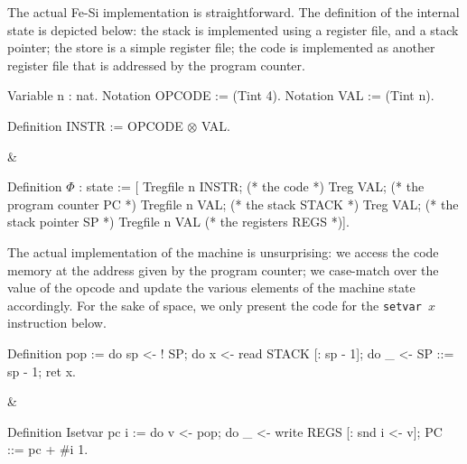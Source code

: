 \documentclass{llncs}
\begin{document}
The actual Fe-Si implementation is straightforward. The definition of
the internal state is depicted below: the stack is implemented using a
register file, and a stack pointer; the store is a simple register
file; the code is implemented as another register file that is
addressed by the program counter.

\begin{twolistings}
\begin{coq}
Variable n : nat. 
Notation OPCODE := (Tint 4).  
Notation VAL := (Tint n). 

Definition INSTR := OPCODE $\otimes$ VAL.  
$ $
\end{coq}
&
\begin{coq}
Definition $\Phi$ : state := [
Tregfile n INSTR;       (* the code *)
Treg VAL;               (* the program counter PC *)
Tregfile n VAL;         (* the stack STACK *)
Treg VAL;               (* the stack pointer SP  *)
Tregfile n VAL          (* the registers REGS *)]. 
\end{coq}
\end{twolistings}

The actual implementation of the machine is unsurprising: we access
the code memory at the address given by the program counter; we
case-match over the value of the opcode and update the various
elements of the machine state accordingly. 
%
For the sake of space, we only present the code for the \texttt{setvar
  $x$} instruction below.

\begin{twolistings}
\begin{coq}
Definition pop :=
do sp <- ! SP;       
do x <- read STACK [: sp - 1];
do _ <- SP ::= sp - 1;
ret x.    
\end{coq}
&
\begin{coq}
Definition Isetvar pc i := 
do v <- pop; 
do _ <- write REGS [: snd i <- v];
PC ::= pc + #i 1.
$ $
\end{coq}
\end{twolistings}
\end{document}
